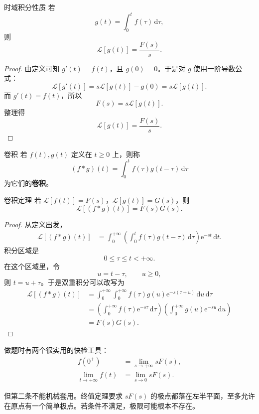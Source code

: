 \begin{dingli}{时域积分性质}{}
若
\[
    g(t)=\int_0^t f(\tau)\,\mathrm{d}\tau,
\]
则
\[
    \mathcal{L}[g(t)]
    =
    \frac{F(s)}{s}.
\]
\end{dingli}

\begin{proof}
由定义可知 $g'(t)=f(t)$，且 $g(0)=0$。于是对 $g$ 使用一阶导数公式：
\[
    \mathcal{L}[g'(t)]
    =
    s\mathcal{L}[g(t)]-g(0)
    =
    s\mathcal{L}[g(t)].
\]
而 $g'(t)=f(t)$，所以
\[
    F(s)=s\mathcal{L}[g(t)].
\]
整理得
\[
    \mathcal{L}[g(t)]
    =
    \frac{F(s)}{s}.
\]
\end{proof}

\begin{dingliyi}{卷积}{}
若 $f(t),g(t)$ 定义在 $t\ge 0$ 上，则称
\[
    (f*g)(t)
    =
    \int_0^t f(\tau)g(t-\tau)\,\mathrm{d}\tau
\]
为它们的\textbf{卷积}。
\end{dingliyi}

\begin{dingli}{卷积定理}{}
若 $\mathcal{L}[f(t)]=F(s)$，$\mathcal{L}[g(t)]=G(s)$，则
\[
    \mathcal{L}[(f*g)(t)]
    =
    F(s)G(s).
\]
\end{dingli}

\begin{proof}
从定义出发，
\begin{align}
    \mathcal{L}[(f*g)(t)]
    &=
    \int_0^{+\infty}
    \left(
        \int_0^t f(\tau)g(t-\tau)\,\mathrm{d}\tau
    \right)
    \mathrm{e}^{-st}\,\mathrm{d}t.
\end{align}
积分区域是
\[
    0\le \tau \le t<+\infty.
\]
在这个区域里，令
\[
    u=t-\tau,
    \qquad u\ge 0,
\]
则 $t=u+\tau$。于是双重积分可以改写为
\begin{align}
    \mathcal{L}[(f*g)(t)]
    &=
    \int_0^{+\infty}\int_0^{+\infty}
    f(\tau)g(u)\mathrm{e}^{-s(\tau+u)}\,\mathrm{d}u\,\mathrm{d}\tau \\
    &=
    \left(
        \int_0^{+\infty} f(\tau)\mathrm{e}^{-s\tau}\,\mathrm{d}\tau
    \right)
    \left(
        \int_0^{+\infty} g(u)\mathrm{e}^{-su}\,\mathrm{d}u
    \right) \\
    &=
    F(s)G(s).
\end{align}
\end{proof}

\begin{tishi}[初值定理和终值定理]
做题时有两个很实用的快检工具：
\begin{align}
    f(0^+) &= \lim_{s\to+\infty} sF(s), \\
    \lim_{t\to+\infty} f(t) &= \lim_{s\to 0} sF(s).
\end{align}

但第二条不能机械套用。终值定理要求 $sF(s)$ 的极点都落在左半平面，至多允许在原点有一个简单极点。若条件不满足，极限可能根本不存在。
\end{tishi}

